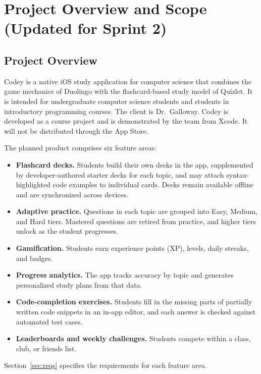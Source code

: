 \documentclass[12pt,letterpaper]{article}
\begin{document}
\section{Project Overview and Scope (Updated for Sprint 2)}

\subsection{Project Overview}
Codey is a native iOS study application for computer science that combines the game
mechanics of Duolingo with the flashcard-based study model of Quizlet. It is intended
for undergraduate computer science students and students in introductory programming
courses. The client is Dr.\ Galloway. Codey is developed as a course project and is
demonstrated by the team from Xcode. It will not be distributed through the App Store.

The planned product comprises six feature areas:
\begin{itemize}
  \item \textbf{Flashcard decks.} Students build their own decks in the app, supplemented by developer-authored starter
        decks for each topic, and may attach
        syntax-highlighted code examples to individual cards. Decks remain available
        offline and are synchronized across devices.
  \item \textbf{Adaptive practice.} Questions in each topic are grouped into Easy,
        Medium, and Hard tiers. Mastered questions are retired from practice, and
        higher tiers unlock as the student progresses.
  \item \textbf{Gamification.} Students earn experience points (XP), levels, daily
        streaks, and badges.
  \item \textbf{Progress analytics.} The app tracks accuracy by topic and generates
        personalized study plans from that data.
  \item \textbf{Code-completion exercises.} Students fill in the missing parts of
        partially written code snippets in an in-app editor, and each answer is checked
        against automated test cases.
  \item \textbf{Leaderboards and weekly challenges.} Students compete within a class,
        club, or friends list.
\end{itemize}
Section~\ref{sec:reqs} specifies the requirements for each feature area.
\end{document}
